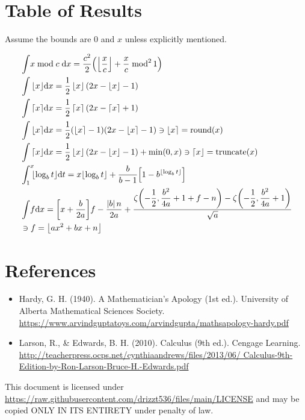 \documentclass[12pt]{article}
\providecommand \floor [1]{\left\lfloor #1 \right\rfloor}
\providecommand \ceil [1]{ \left\lceil  #1 \right\rceil}
\providecommand \round [1]{\left\lfloor #1 \right\rceil}
\providecommand \trunc [1]{\left\lceil  #1 \right\rfloor}
\providecommand \pgrp [1]{\left( #1 \right)}   %
\providecommand \bgrp [1]{\left[ #1 \right]}   %
\providecommand \abs [1]{\left| #1 \right|}
\providecommand \dx {\df x}
\providecommand \dt {\df t}
\providecommand \df [1]{\mathrm d #1}
\begin{document}
{}
\section*{Table of Results}

	\indent\indent Assume the bounds are $0$ and $x$ unless explicitly mentioned.

	\begin{minipage}{\textwidth}
		\centering
		\begin{align}
			& \int \! x \bmod c\; \dx = \dfrac{c^2}2\!\pgrp{\floor{\dfrac xc}+
										\dfrac xc\;\mathrm{mod}^2\,1}\\
			& \int \floor x\!\dx = \dfrac12\floor x(2x-\floor x-1)\\
			& \int \ceil  x\!\dx = \dfrac12\ceil x(2x-\ceil x+1)\\
			& \int \round x\!\dx = \dfrac12(\round x-1)(2x-\round x-1)\ni\round x=
								\mathrm{round}(x)\\
			& \int \trunc x\!\dx = \dfrac12\floor x(2x - \floor x - 1) + \min(0,x) \ni\trunc x =
								\mathrm{truncate}(x)\\
			& \int_1^x \!\!\!\floor{\log_b t}\!\dt = x \!\floor{\log_b t} + \dfrac b{b-1}\!
												\bgrp{1 - b^{\floor{\log_b t}}} \\
			& \int \!f \dx = \bgrp{x+\dfrac b{2a}}\!f-\dfrac{\abs bn}{2a}+\dfrac{\zeta\!\pgrp{-
							\dfrac12,\dfrac{b^2}{4a}+1+f-n}-\zeta\!\pgrp{-\dfrac12,\dfrac{b^2}{4a}
							+1}}{\sqrt a}\\
			& \ni f = \floor{ax^2 + bx + n} \notag
		\end{align}
	\end{minipage}

{}
\section*{References}

	\begin{itemize}
		\item Hardy, G. H. (1940). A Mathematician's Apology (1st ed.). University of Alberta
			Mathematical Sciences Society.\\
			\url{https://www.arvindguptatoys.com/arvindgupta/mathsapology-hardy.pdf}\\

		\item Larson, R., \& Edwards, B. H. (2010). Calculus (9th ed.). Cengage Learning.\\
			\url{http://teacherpress.ocps.net/cynthiaandrews/files/2013/06/
			Calculus-9th-Edition-by-Ron-Larson-Bruce-H.-Edwards.pdf}
	\end{itemize}
	\vfill
	This document is licensed under
	\url{https://raw.githubusercontent.com/drizzt536/files/main/LICENSE}
	and may be copied ONLY IN ITS ENTIRETY under penalty of law.
	\vspace{0.5em}
\end{document}
